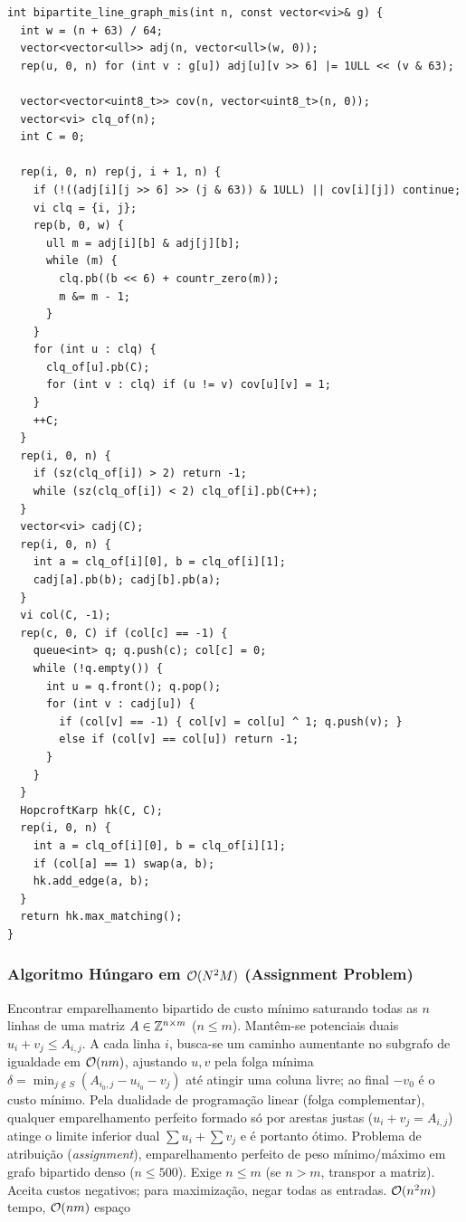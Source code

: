 \begin{lstlisting}
int bipartite_line_graph_mis(int n, const vector<vi>& g) {
  int w = (n + 63) / 64;
  vector<vector<ull>> adj(n, vector<ull>(w, 0));
  rep(u, 0, n) for (int v : g[u]) adj[u][v >> 6] |= 1ULL << (v & 63);

  vector<vector<uint8_t>> cov(n, vector<uint8_t>(n, 0));
  vector<vi> clq_of(n);
  int C = 0;

  rep(i, 0, n) rep(j, i + 1, n) {
    if (!((adj[i][j >> 6] >> (j & 63)) & 1ULL) || cov[i][j]) continue;
    vi clq = {i, j};
    rep(b, 0, w) {
      ull m = adj[i][b] & adj[j][b];
      while (m) {
        clq.pb((b << 6) + countr_zero(m));
        m &= m - 1;
      }
    }
    for (int u : clq) {
      clq_of[u].pb(C);
      for (int v : clq) if (u != v) cov[u][v] = 1;
    }
    ++C;
  }
  rep(i, 0, n) {
    if (sz(clq_of[i]) > 2) return -1;
    while (sz(clq_of[i]) < 2) clq_of[i].pb(C++);
  }
  vector<vi> cadj(C);
  rep(i, 0, n) {
    int a = clq_of[i][0], b = clq_of[i][1];
    cadj[a].pb(b); cadj[b].pb(a);
  }
  vi col(C, -1);
  rep(c, 0, C) if (col[c] == -1) {
    queue<int> q; q.push(c); col[c] = 0;
    while (!q.empty()) {
      int u = q.front(); q.pop();
      for (int v : cadj[u]) {
        if (col[v] == -1) { col[v] = col[u] ^ 1; q.push(v); }
        else if (col[v] == col[u]) return -1;
      }
    }
  }
  HopcroftKarp hk(C, C);
  rep(i, 0, n) {
    int a = clq_of[i][0], b = clq_of[i][1];
    if (col[a] == 1) swap(a, b);
    hk.add_edge(a, b);
  }
  return hk.max_matching();
}
\end{lstlisting}

\subsubsection{Algoritmo Húngaro em $\mathcal{O}(N^2 M)$ (Assignment Problem)}
\algobox
  {Encontrar emparelhamento bipartido de custo mínimo saturando todas as $n$ linhas de uma matriz $A \in \mathbb{Z}^{n \times m}$ ($n \le m$).}
  {Mantêm-se potenciais duais $u_i + v_j \le A_{i,j}$. A cada linha $i$, busca-se um caminho aumentante no subgrafo de igualdade em $\mathcal{O}(nm)$, ajustando $u, v$ pela folga mínima $\delta = \min_{j \notin S}(A_{i_0,j} - u_{i_0} - v_j)$ até atingir uma coluna livre; ao final $-v_0$ é o custo mínimo.}
  {Pela dualidade de programação linear (folga complementar), qualquer emparelhamento perfeito formado só por arestas justas ($u_i + v_j = A_{i,j}$) atinge o limite inferior dual $\sum u_i + \sum v_j$ e é portanto ótimo.}
  {Problema de atribuição (\emph{assignment}), emparelhamento perfeito de peso mínimo/máximo em grafo bipartido denso ($n \le 500$).}
  {Exige $n \le m$ (se $n > m$, transpor a matriz). Aceita custos negativos; para maximização, negar todas as entradas.}
  {$\mathcal{O}(n^2 m)$ tempo, $\mathcal{O}(nm)$ espaço}

